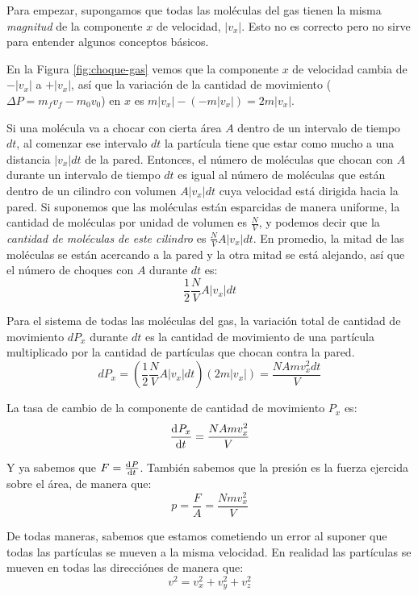 \documentclass[12pt]{article}
\begin{document}
  Para empezar, supongamos que todas las moléculas del gas tienen la misma \textit{magnitud} de la componente $ x $ de velocidad, $ \left|v_{x}\right| $. Esto no es correcto pero no sirve para entender algunos conceptos básicos.

  En la Figura \ref{fig:choque-gas} vemos que la componente $ x $ de velocidad cambia de $ -\left|v_{x}\right| $ a $ +\left|v_{x}\right| $, así que la variación de la cantidad de movimiento ($ \Delta P = m_{f}v_{f}-m_{0}v_{0} $) en $ x $ es $ m\left|v_{x}\right| - (-m\left|v_{x}\right|) = 2m\left|v_{x}\right| $.

  Si una molécula va a chocar con cierta área $ A $ dentro de un intervalo de tiempo $ dt $, al comenzar ese intervalo $ dt $ la partícula tiene que estar como mucho a una distancia $ \left|v_{x}\right|dt $ de la pared. Entonces, el número de moléculas que chocan con $ A $ durante un intervalo de tiempo $ dt $ es igual al número de moléculas que están dentro de un cilindro con volumen $ A\left|v_{x}\right|dt $ cuya velocidad está dirigida hacia la pared. Si suponemos que las moléculas están esparcidas de manera uniforme, la cantidad de moléculas por unidad de volumen es $ \frac{N}{V} $, y podemos decir que la \textit{cantidad de moléculas de este cilindro} es $ \frac{N}{V}A\left|v_{x}\right|dt $. En promedio, la mitad de las moléculas se están acercando a la pared y la otra mitad se está alejando, así que el número de choques con $ A $ durante $ dt $ es:
  \[
  \frac{1}{2}\frac{N}{V}A\left|v_{x}\right|dt
  \]
  
  Para el sistema de todas las moléculas del gas, la variación total de cantidad de movimiento $ dP_{x} $ durante $ dt $ es la cantidad de movimiento de una partícula multiplicado por la cantidad de partículas que chocan contra la pared.
  \[
  dP_{x} = \left(\frac{1}{2}\frac{N}{V}A\left|v_{x}\right|dt\right)\left(2m\left|v_{x}\right|\right) = \frac{NAmv_{x}^{2}dt}{V}
  \]

  La tasa de cambio de la componente de cantidad de movimiento $ P_{x} $ es:
  \[
  \dv[]{P_{x}}{t} = \frac{NAmv_{x}^{2}}{V}
  \]

  Y ya sabemos que $ F = \dv[]{P}{t} $. También sabemos que la presión es la fuerza ejercida sobre el área, de manera que:
  \[
    p = \frac{F}{A} = \frac{Nmv_{x}^{2}}{V}
  \]

  De todas maneras, sabemos que estamos cometiendo un error al suponer que todas las partículas se mueven a la misma velocidad. En realidad las partículas se mueven en todas las direcciónes de manera que:
  \[
  v^{2} = v_{x}^{2} + v_{y}^{2} + v_{z}^{2}
  \]
\end{document}
